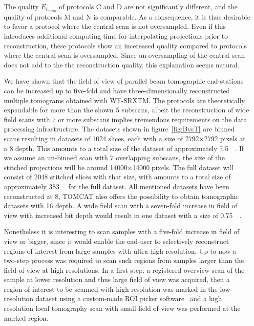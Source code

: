 The quality $E_{i_{norm}}$ of protocols C and D are not significantly different, and the quality of protocols M and N is comparable. As a consequence, it is thus desirable to favor a protocol where the central scan is not oversampled. Even if this introduces additional computing time for interpolating projections prior to reconstruction, these protocols show an incereased quality compared to protocols where the central scan is oversampled. Since an oversampling of the central scan does not add to the the reconstruction quality, this explanation seems natural.

We have shown that the field of view of parallel beam tomographic end-stations can be increased up to five-fold and have three-dimensionally reconstructed multiple tomograms obtained with WF-SRXTM. The protocols are theoretically expandable for more than the shown 5 subscans, albeit the reconstruction of wide field scans with 7 or more subscans implies tremendous requirements on the data processing infrastructure. The datasets shown in figure~\ref{fig:BvsT} are binned scans resulting in datasets of 1024 slices, each with a size of 2792$\times$2792 pixels at a \SI{8}{\bit} depth. This amounts to a total size of the dataset of approximately \SI{7.5}{\giga\byte}. If we assume an un-binned scan with 7 overlapping subscans, the size of the stitched projections will be around 14000$\times$14000 pixels. The full dataset will consist of 2048 stitched slices with that size, with amounts to a total size of approximately \SI{383}{\giga\byte} for the full dataset. All mentioned datasets have been reconstructed at \SI{8}{\bit}, TOMCAT also offers the possibility to obtain tomographic datasets with \SI{16}{\bit} depth. A wide field scan with a seven-fold increase in field of view with increased bit depth would result in one dataset with a size of \SI{0.75}{\tera\byte}.

Nonetheless it is interesting to scan samples with a five-fold increase in field of view or bigger, since it would enable the end-user to selectively reconstruct regions of interest from large samples with ultra-high resolution. Up to now a two-step process was required to scan such regions from samples larger than the field of view at high resolutions. In a first step, a registered overview scan of the sample at lower resolution and thus large field of view was acquired, then a region of interest to be scanned with high resolution was marked in the low-resolution dataset using a custom-made ROI picker software~\cite{Heinzer2008} and a high resolution local tomography scan with small field of view was performed at the marked region.

